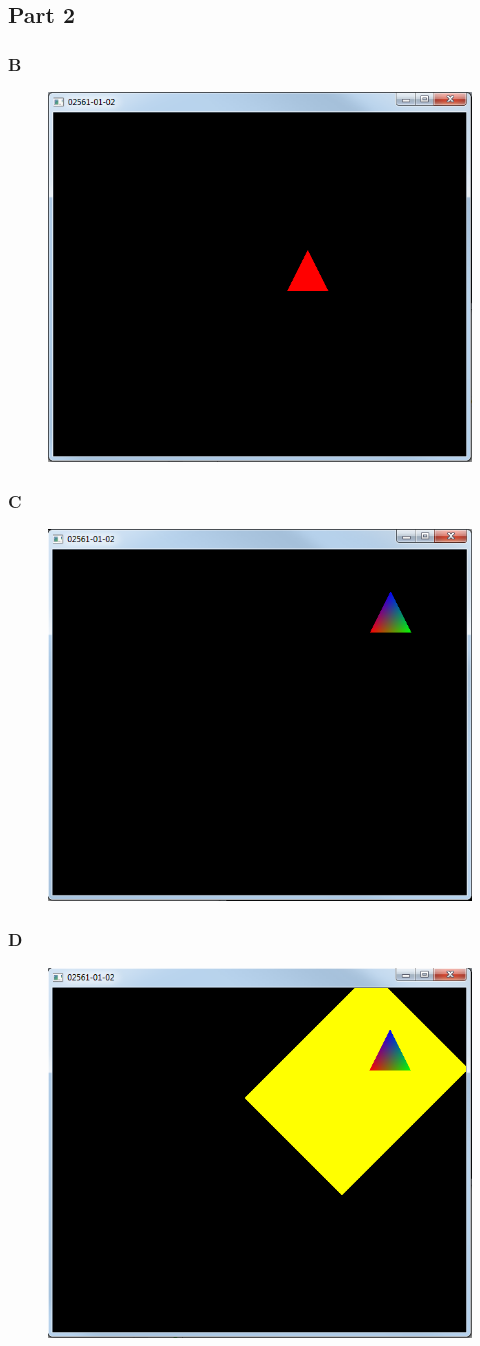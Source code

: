 \documentclass[11pt]{article}
\begin{document}
\subsection{Part 2}
\subsubsection{B}
\begin{figure}[H]
\centering
\includegraphics[width=0.5\linewidth]{images/e01p2b}
\label{fig:e01p2b}
\end{figure}

\subsubsection{C}
\begin{figure}[H]
	\centering
	\includegraphics[width=0.5\linewidth]{images/e01p2c}
	\label{fig:e01p2c}
\end{figure}

\subsubsection{D}
\begin{figure}[H]
	\centering
	\includegraphics[width=0.5\linewidth]{images/e01p2d}
	\label{fig:e01p2d}
\end{figure}
\end{document}

